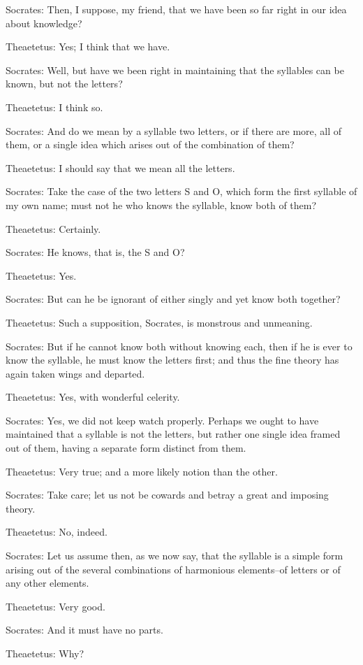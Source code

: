 Socrates: Then, I suppose, my friend, that we have been so far right in
our idea about knowledge?

Theaetetus: Yes; I think that we have.

Socrates: Well, but have we been right in maintaining that the syllables
can be known, but not the letters?

Theaetetus: I think so.

Socrates: And do we mean by a syllable two letters, or if there are
more, all of them, or a single idea which arises out of the combination
of them?

Theaetetus: I should say that we mean all the letters.

Socrates: Take the case of the two letters S and O, which form the first
syllable of my own name; must not he who knows the syllable, know both
of them?

Theaetetus: Certainly.

Socrates: He knows, that is, the S and O?

Theaetetus: Yes.

Socrates: But can he be ignorant of either singly and yet know both
together?

Theaetetus: Such a supposition, Socrates, is monstrous and unmeaning.

Socrates: But if he cannot know both without knowing each, then if he is
ever to know the syllable, he must know the letters first; and thus the
fine theory has again taken wings and departed.

Theaetetus: Yes, with wonderful celerity.

Socrates: Yes, we did not keep watch properly. Perhaps we ought to have
maintained that a syllable is not the letters, but rather one single
idea framed out of them, having a separate form distinct from them.

Theaetetus: Very true; and a more likely notion than the other.

Socrates: Take care; let us not be cowards and betray a great and
imposing theory.

Theaetetus: No, indeed.

Socrates: Let us assume then, as we now say, that the syllable is
a simple form arising out of the several combinations of harmonious
elements--of letters or of any other elements.

Theaetetus: Very good.

Socrates: And it must have no parts.

Theaetetus: Why?

